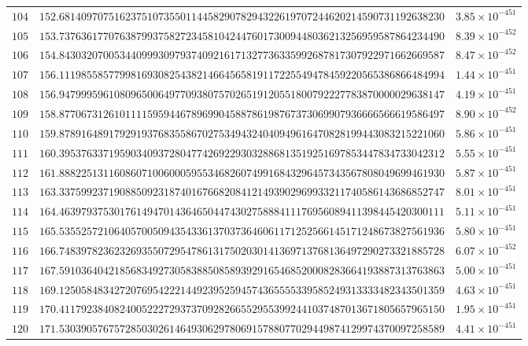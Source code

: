 \documentclass[12pt,reqno]{amsart}
\theoremstyle{remark}
\begin{document}
\begin{longtable}{clc}
$104$ & $152.6814097075162375107355011445829078294322619707244620214590731192638230$ & $3.85\times 10^{-451}$ \\
$105$ & $153.7376361770763879937582723458104244760173009448036213256959587864234490$ & $8.39\times 10^{-452}$ \\
$106$ & $154.8430320700534409993097937409216171327736335992687817307922971662669587$ & $8.47\times 10^{-452}$ \\
$107$ & $156.1119855857799816930825438214664565819117225549478459220565386866484994$ & $1.44\times 10^{-451}$ \\
$108$ & $156.9479995961080965006497709380757026519120551800792227783870000029638147$ & $4.19\times 10^{-451}$ \\
$109$ & $158.8770673126101111595944678969904588786198767373069907936666566619586497$ & $8.90\times 10^{-452}$ \\
$110$ & $159.8789164891792919376835586702753494324040949616470828199443083215221060$ & $5.86\times 10^{-451}$ \\
$111$ & $160.3953763371959034093728047742692293032886813519251697853447834733042312$ & $5.55\times 10^{-451}$ \\
$112$ & $161.8882251311608607100600059553468260749916843296457343567808049699461930$ & $5.87\times 10^{-451}$ \\
$113$ & $163.3375992371908850923187401676682084121493902969933211740586143686852747$ & $8.01\times 10^{-451}$ \\
$114$ & $164.4639793753017614947014364650447430275888411176956089411398445420300111$ & $5.11\times 10^{-451}$ \\
$115$ & $165.5355257210640570050943543361370373646061171252566145171248673827561936$ & $5.80\times 10^{-451}$ \\
$116$ & $166.7483978236232693550729547861317502030141369713768136497290273321885728$ & $6.07\times 10^{-452}$ \\
$117$ & $167.5910364042185683492730583885085893929165468520008283664193887313763863$ & $5.00\times 10^{-451}$ \\
$118$ & $169.1250584834272076954222144923952594574365555339585249313333482343501359$ & $4.63\times 10^{-451}$ \\
$119$ & $170.4117923840824005222729373709282665529553992441037487013671805657965150$ & $1.95\times 10^{-451}$ \\
$120$ & $171.5303905767572850302614649306297806915788077029449874129974370097258589$ & $4.41\times 10^{-451}$ \\

\end{longtable}
\end{document}
